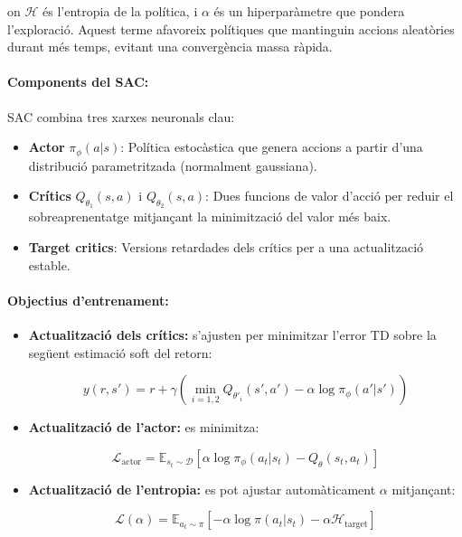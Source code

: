 \documentclass[12pt,a4paper,twoside]{book}
\begin{document}
on $\mathcal{H}$ és l'entropia de la política, i $\alpha$ és un hiperparàmetre que pondera l'exploració. Aquest terme afavoreix polítiques que mantinguin accions aleatòries durant més temps, evitant una convergència massa ràpida.

\paragraph{Components del SAC:}

SAC combina tres xarxes neuronals clau:

\begin{itemize}
  \item \textbf{Actor} $\pi_\phi(a|s)$: Política estocàstica que genera accions a partir d'una distribució parametritzada (normalment gaussiana).
  \item \textbf{Crítics} $Q_{\theta_1}(s,a)$ i $Q_{\theta_2}(s,a)$: Dues funcions de valor d'acció per reduir el sobreaprenentatge mitjançant la minimització del valor més baix.
  \item \textbf{Target critics}: Versions retardades dels crítics per a una actualització estable.
\end{itemize}

\paragraph{Objectius d'entrenament:}

\begin{itemize}
  \item \textbf{Actualització dels crítics:} s'ajusten per minimitzar l'error TD sobre la següent estimació soft del retorn:

  \begin{equation}
  y(r,s') = r + \gamma \left( \min_{i=1,2} Q_{\theta'_i}(s', a') - \alpha \log \pi_\phi(a'|s') \right)
  \end{equation}

  \item \textbf{Actualització de l'actor:} es minimitza:

  \begin{equation}
  \mathcal{L}_{\text{actor}} = \mathbb{E}_{s_t \sim \mathcal{D}} \left[ \alpha \log \pi_\phi(a_t|s_t) - Q_{\theta}(s_t, a_t) \right]
  \end{equation}

  \item \textbf{Actualització de l'entropia:} es pot ajustar automàticament $\alpha$ mitjançant:

  \begin{equation}
  \mathcal{L}(\alpha) = \mathbb{E}_{a_t \sim \pi} \left[ -\alpha \log \pi(a_t|s_t) - \alpha \mathcal{H}_\text{target} \right]
  \end{equation}

\end{itemize}
\end{document}
